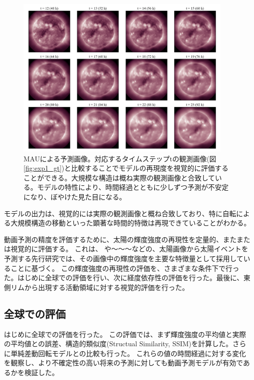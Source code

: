     \begin{figure}[htbp]
      \centering
      \includegraphics[width=0.95\textwidth]{figures/exp1/pd.png}
      \caption{MAUによる予測画像。対応するタイムステップtの観測画像(図\ref{fig:exp1_gt})と比較することでモデルの再現度を視覚的に評価することができる。大規模な構造は概ね実際の観測画像と合致している。モデルの特性により、時間経過とともに少しずつ予測が不安定になり、ぼやけた見た目になる。}
      \label{fig:exp1_pd}
    \end{figure}
    モデルの出力は、視覚的には実際の観測画像と概ね合致しており、特に自転による大規模構造の移動といった顕著な時間的特徴は再現できていることがわかる。

    動画予測の精度を評価するために、太陽の輝度強度の再現性を定量的、またまたは視覚的に評価する。
    これは、 や〜〜〜などの、太陽画像から太陽イベントを予測する先行研究では、その画像中の輝度強度を主要な特徴量として採用していることに基づく。
    この輝度強度の再現性の評価を、さまざまな条件下で行った。はじめに全球での評価を行い、次に経度依存性の評価を行った。最後に、東側リムから出現する活動領域に対する視覚的評価を行った。


    \subsection{全球での評価}
      はじめに全球での評価を行った。
      この評価では、まず輝度強度の平均値と実際の平均値との誤差、構造的類似度(Structual Similarity, SSIM)を計算した。さらに単純差動回転モデルとの比較も行った。
      これらの値の時間経過に対する変化を観察し、より不確定性の高い将来の予測に対しても動画予測モデルが有効であるかを検証した。
      
